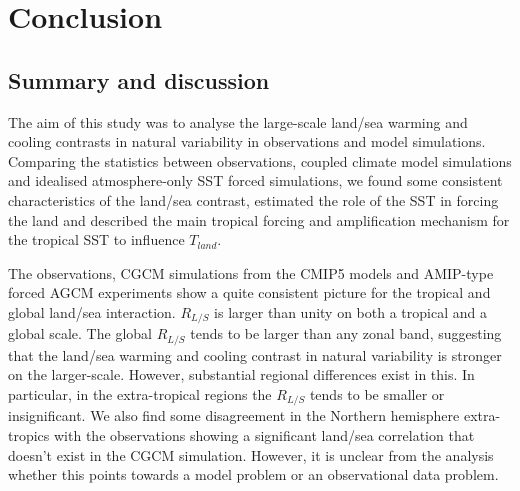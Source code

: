 \chapter{Conclusion} 

\label{conclusion} 


\section{Summary and discussion}

The aim of this study was to analyse the large-scale land/sea warming and 
cooling contrasts in natural variability in observations and model simulations.  
Comparing the statistics between observations, coupled climate model simulations 
and idealised atmosphere-only SST forced simulations, we found some consistent 
characteristics of the land/sea contrast, estimated the role of the SST in 
forcing the land and described the main tropical forcing and amplification 
mechanism for the tropical SST to influence $T_{land}$.

The observations, CGCM simulations from the CMIP5 models and AMIP-type forced 
AGCM experiments show a quite consistent picture for the tropical and global 
land/sea interaction. $R_{L/S}$ is larger than unity on both a tropical and a 
global scale. The global $R_{L/S}$ tends to be larger than any zonal band, 
suggesting that the land/sea warming and cooling contrast in natural variability 
is stronger on the larger-scale. However, substantial regional differences exist 
in this. In particular, in the extra-tropical regions the $R_{L/S}$ tends to be 
smaller or insignificant. We also find some disagreement in the Northern 
hemisphere extra-tropics with the observations showing a significant land/sea 
correlation that doesn't exist in the CGCM simulation.  However, it is unclear 
from the analysis whether this points towards a model problem or an 
observational data problem.


